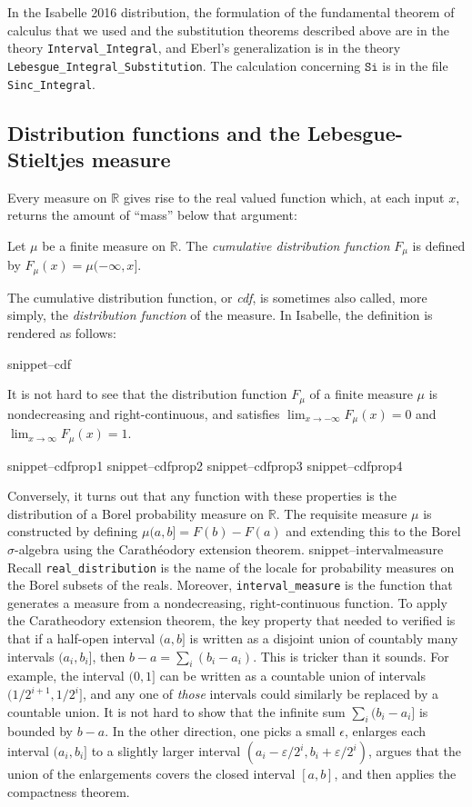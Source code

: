 \documentclass{svjour3}
\newcommand{\RR}{\mathbb{R}}
\newcommand{\fn}[1]{\mathtt{#1}} %
\newcommand{\Snippet}[1]{\csname snippet--#1\endcsname}
\begin{document}
In the Isabelle 2016 distribution, the formulation of the fundamental theorem of calculus that we used and the substitution theorems described above are in the theory \verb=Interval_Integral=, and Eberl's generalization is in the theory \verb=Lebesgue_Integral_Substitution=. The calculation concerning $\fn{Si}$ is in the file \verb=Sinc_Integral=.

\subsection{Distribution functions and the Lebesgue-Stieltjes measure}
\label{subsection:distribution:functions}

Every measure on $\RR$ gives rise to the real valued function which, at each input $x$, returns the amount of ``mass'' below that argument:

\begin{definition}
Let $\mu$ be a finite measure on $\RR$. The \emph{cumulative distribution function} $F_\mu$ is defined by $F_\mu(x) = \mu (-\infty, x]$.
\end{definition}
The cumulative distribution function, or \emph{cdf}, is sometimes also called, more simply, the \emph{distribution function} of the measure. In Isabelle, the definition is rendered as follows:

\Snippet{cdf}

It is not hard to see that the distribution function $F_\mu$ of a finite measure $\mu$ is nondecreasing and right-continuous, and satisfies $\lim_{x \rightarrow -\infty} F_\mu(x) = 0$ and \linebreak $\lim_{x \rightarrow \infty} F_\mu(x) = 1$.

\Snippet{cdfprop1}
\Snippet{cdfprop2}
\Snippet{cdfprop3}
\Snippet{cdfprop4}

Conversely, it turns out that any function with these properties is the distribution of a Borel probability measure on $\RR$. The requisite measure $\mu$ is constructed by defining $\mu (a,b] = F(b) - F(a)$ and extending this to the Borel $\sigma$-algebra using the Carath\'eodory extension theorem.
\Snippet{intervalmeasure}
Recall \texttt{real\_distribution} is the name of the locale for probability measures on the Borel subsets of the reals. Moreover, \texttt{interval\_measure} is the function that generates a measure from a nondecreasing, right-continuous function. To apply the Caratheodory extension theorem, the key property that needed to verified is that if a half-open interval $(a, b]$ is written as a disjoint union of countably many intervals $(a_i, b_i]$, then $b - a = \sum_i (b_i - a_i)$. This is tricker than it sounds. For example, the interval $(0, 1]$ can be written as a countable union of intervals $(1/2^{i+1}, 1/2^i]$, and any one of \emph{those} intervals could similarly be replaced by a countable union. It is not hard to show that the infinite sum $\sum_i (b_i - a_i]$ is bounded by $b - a$. In the other direction, one picks a small $\epsilon$, enlarges each interval $(a_i, b_i]$ to a slightly larger interval $(a_i - \varepsilon/2^i, b_i + \varepsilon / 2^i)$, argues that the union of the enlargements covers the closed interval $[a, b]$, and then applies the compactness theorem.
\end{document}
